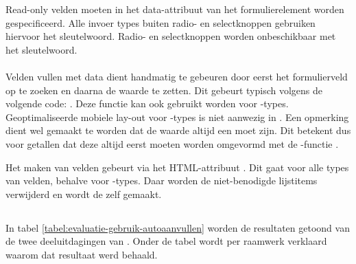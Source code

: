 Read-only velden moeten in het data-attribuut van het formulierelement worden gespecificeerd.
Alle invoer types buiten radio- en selectknoppen gebruiken hiervoor het  sleutelwoord.
Radio- en selectknoppen worden onbeschikbaar met het  sleutelwoord.

\paragraph{\lungo}
Velden vullen met data dient handmatig te gebeuren door eerst het formulierveld op te zoeken en daarna de waarde te zetten.
Dit gebeurt typisch volgens de volgende code: .
Deze functie kan ook gebruikt worden voor -types.
Geoptimaliseerde mobiele lay-out voor -types is niet aanwezig in \lungo.
Een opmerking dient wel gemaakt te worden dat de waarde altijd een  moet zijn.
Dit betekent dus voor getallen dat deze altijd eerst moeten worden omgevormd met de \js{}-functie . 

Het  maken van velden gebeurt via het HTML-attribuut .
Dit gaat voor alle types van velden, behalve voor -types.
Daar worden de niet-benodigde lijstitems verwijderd en wordt de  zelf  gemaakt.


\subsection{}
\label{sec:evaluatie-gebruik-autoaanvullen}

In tabel \ref{tabel:evaluatie-gebruik-autoaanvullen} worden de resultaten getoond van de twee deeluitdagingen van .
Onder de tabel wordt per raamwerk verklaard waarom dat resultaat werd behaald.

\begin{table}[H]
\centering
{}
\caption{Gebruik van  voor \st{}~(\sta), \kendo{}~(\kendoa), \jqm{}~(\jqma) en \lungo{}~(\lungoa).}
\label{tabel:evaluatie-gebruik-autoaanvullen}
\end{table}

